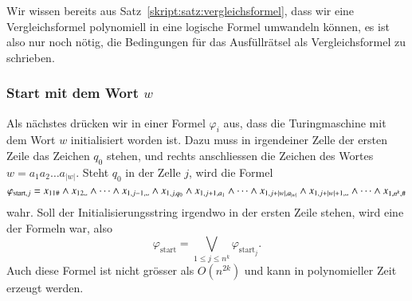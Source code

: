 Wir wissen bereits aus Satz~\ref{skript:satz:vergleichsformel}, dass wir
eine Vergleichsformel polynomiell in eine logische Formel umwandeln
können, es ist also nur noch nötig, die Bedingungen für das Ausfüllrätsel
als Vergleichsformel zu schrieben.


\subsubsection{Start mit dem Wort $w$}
Als nächstes drücken wir in einer Formel $\varphi_i$ aus,
dass die Turingmaschine mit dem
Wort $w$ initialisiert worden ist. Dazu muss in irgendeiner
Zelle der ersten Zeile das Zeichen $q_0$ stehen, und rechts
anschliessen die Zeichen des Wortes $w=a_1a_2\dots a_{|w|}$.
Steht $q_0$ in der
Zelle $j$, wird die Formel
\[
\varphi_{\text{start},j}
=
x_{11\#}\wedge
x_{12\blank}\wedge \dots \wedge
x_{1,j-1,\blank}\wedge
x_{1,j,q_0}\wedge
x_{1,j+1,a_1}\wedge\dots\wedge
x_{1,j+|w|,a_{|w|}}\wedge
x_{1,j+|w|+1,\blank}\wedge\dots\wedge
x_{1,n^k,\#}
\]
wahr.
Soll der Initialisierungsstring irgendwo in der ersten Zeile
stehen, wird eine der Formeln war, also
\[
\varphi_{\text{start}} = \bigvee_{1\le j\le n^k} \varphi_{\text{start}_j}.
\]
Auch diese Formel ist nicht grösser als $O(n^{2k})$ und kann in
polynomieller Zeit erzeugt werden.

